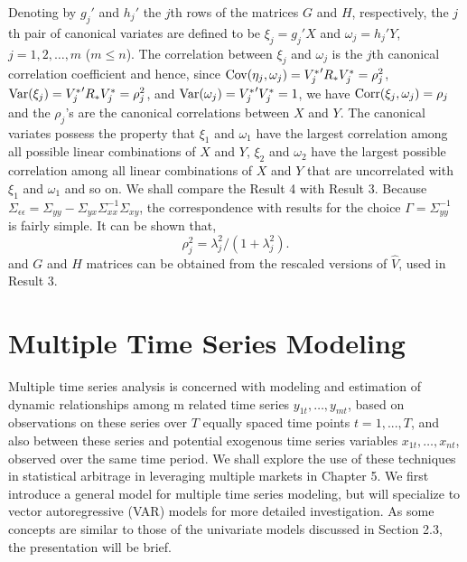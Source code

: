 Denoting by $g_j'$ and $h_j'$ the $j$th rows of the matrices $G$ and $H$, respectively, the $j$th pair of canonical variates are defined to be $\xi_j=g_j'X$ and $\omega_j=h_j'Y$, $j=1,2,\ldots,m$ ($m \leq n$). The correlation between $\xi_j$ and $\omega_j$ is the $j$th canonical correlation coefficient and hence, since $\operatorname{Cov}(\eta_j,\omega_j)={V_j^*}' R_*V_j^*=\rho_j^2$, $\operatorname{Var}(\xi_j)={V_j^*}' R_*V_j^*=\rho_j^2$, and $\operatorname{Var}(\omega_j)={V_j^*}' V_j^*=1$, we have $\operatorname{Corr}(\xi_j,\omega_j)=\rho_j$ and the $\rho_j$'s are the canonical correlations between $X$ and $Y$. The canonical variates possess the property that $\xi_1$ and $\omega_1$ have the largest correlation among all possible linear combinations of $X$ and $Y$, $\xi_2$ and $\omega_2$ have the largest possible correlation among all linear combinations of $X$ and $Y$ that are uncorrelated with $\xi_1$ and $\omega_1$ and so on. We shall compare the Result 4 with Result 3. Because $\Sigma_{\epsilon\epsilon}=\Sigma_{yy}-\Sigma_{yx}\Sigma_{xx}^{-1}\Sigma_{xy}$, the correspondence with results for the choice $\Gamma=\Sigma_{yy}^{-1}$ is fairly simple. It can be shown that,
	\begin{equation}\label{eqn:rhojsqlambj}
	\rho_j^2=\lambda_j^2/(1+\lambda_j^2).
	\end{equation}
and $G$ and $H$ matrices can be obtained from the rescaled versions of $\hat{V}$, used in Result 3. 


\section{Multiple Time Series Modeling}


Multiple time series analysis is concerned with modeling and estimation of dynamic relationships among m related time series $y_{1t},\ldots,y_{mt}$, based on observations on these series over $T$ equally spaced time points $t=1,...,T$, and also between these series and potential exogenous time series variables $x_{1t},\ldots,x_{nt}$, observed over the same time period. We shall explore the use of these techniques in statistical arbitrage in leveraging multiple markets in Chapter 5. We first introduce a general model for multiple time series modeling, but will specialize to vector autoregressive (VAR) models for more detailed investigation. As some concepts are similar to those of the univariate models discussed in Section 2.3, the presentation will be brief.


